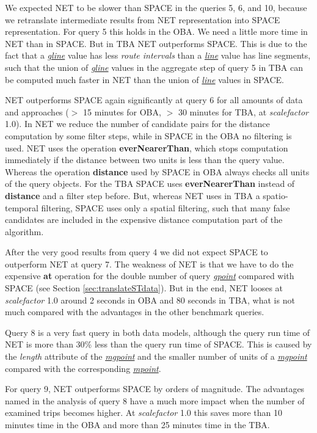 \documentclass[a4paper]{article}
\newcommand{\op}[1]{\textbf{#1}}
\newcommand{\dt}[1]{\textsl{\underline{#1}}}
\begin{document}
We expected NET to be slower than SPACE in the queries 5, 6, and 10, because
we retranslate intermediate results from NET representation into SPACE
representation.
For query 5 this holds in the OBA. We need a little more time in NET
than in SPACE. But in TBA NET outperforms SPACE. This is due to the fact
that a \dt{gline} value has less \textit{route intervals}
than a \dt{line} value has line segments,
such that the union of \dt{gline} values in the aggregate step of query 5 in
TBA can be computed much faster in NET than the union of \dt{line} values in SPACE.

NET outperforms SPACE again significantly at query 6
for all amounts of data and approaches ($>$ 15 minutes for OBA, $>$
30 minutes for TBA, at \textit{scalefactor} 1.0). In NET we reduce the number of
candidate
pairs for the distance computation by some filter steps, while in SPACE
in the OBA no filtering is used. NET uses the operation \op{everNearerThan}, which
stops computation immediately if the distance between two units is less than the
query value. Whereas the operation \op{distance} used by SPACE in OBA always checks
all units of the query objects. For the TBA SPACE uses \op{everNearerThan}
instead of \op{distance} and a filter step before. But, whereas NET uses in TBA
a spatio-temporal filtering, SPACE uses only a spatial filtering, such that many
false candidates are included in the expensive distance computation part of the
algorithm.

After the very good results from query 4 we did not expect SPACE to outperform
NET at query 7. The weakness of NET is that we have to do the expensive \op{at}
operation for the double number of query \dt{gpoint} compared with SPACE
(see Section \ref{sec:translateSTdata}).
But in the end, NET looses at \textit{scalefactor} 1.0 around 2 seconds in OBA
and 80 seconds in TBA, what is not much compared with the advantages in the other
benchmark queries.

Query 8 is a very fast query in both data models, although the query run time of
NET is more than 30\% less than the query run time of SPACE. This is caused by the
\textit{length} attribute of the \dt{mgpoint} and the smaller number of units of a
\dt{mgpoint} compared with the corresponding \dt{mpoint}.

For query 9, NET outperforms SPACE by orders of magnitude. The advantages
named in the analysis of query 8 have a much more impact
when the number of examined trips becomes higher. At \textit{scalefactor} 1.0
this saves
more than 10 minutes time in the OBA and more than 25 minutes time in the TBA.
\end{document}
